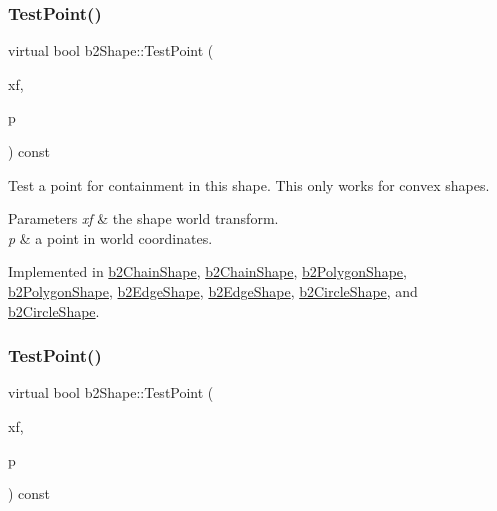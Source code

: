\mbox{\label{classb2Shape_a6ac968e403e2d93e8ae46d728a2e50fa}} 
\subsubsection{\texorpdfstring{Test\+Point()}{TestPoint()}\hspace{0.1cm}{\footnotesize\ttfamily [1/2]}}
{\footnotesize\ttfamily virtual bool b2\+Shape\+::\+Test\+Point (\begin{DoxyParamCaption}\item[{const \hyperlink{structb2Transform}{b2\+Transform} \&}]{xf,  }\item[{const \hyperlink{structb2Vec2}{b2\+Vec2} \&}]{p }\end{DoxyParamCaption}) const\hspace{0.3cm}{\ttfamily [pure virtual]}}

Test a point for containment in this shape. This only works for convex shapes. 
\begin{DoxyParams}{Parameters}
{\em xf} & the shape world transform. \\
\hline
{\em p} & a point in world coordinates. \\
\hline
\end{DoxyParams}


Implemented in \hyperlink{classb2ChainShape_afd03c8679f18f9962a6c76bde629c62a}{b2\+Chain\+Shape}, \hyperlink{classb2ChainShape_a2d2d59b49c2611ad65ed68b0943d642d}{b2\+Chain\+Shape}, \hyperlink{classb2PolygonShape_a1e70b4546c997628bbc8eeffe55c2423}{b2\+Polygon\+Shape}, \hyperlink{classb2PolygonShape_a129c4ac76727fe02724f675e3fef7fe5}{b2\+Polygon\+Shape}, \hyperlink{classb2EdgeShape_a23a429c4cf919ff5140ca28b53db43fe}{b2\+Edge\+Shape}, \hyperlink{classb2EdgeShape_a15151673cf9ad585779c70363425f470}{b2\+Edge\+Shape}, \hyperlink{classb2CircleShape_a764b0ec9fbd65c9ea091672a25eefcf7}{b2\+Circle\+Shape}, and \hyperlink{classb2CircleShape_a84e22b3807e84b72f2981010fc197099}{b2\+Circle\+Shape}.

\mbox{\label{classb2Shape_a6ac968e403e2d93e8ae46d728a2e50fa}} 
\subsubsection{\texorpdfstring{Test\+Point()}{TestPoint()}\hspace{0.1cm}{\footnotesize\ttfamily [2/2]}}
{\footnotesize\ttfamily virtual bool b2\+Shape\+::\+Test\+Point (\begin{DoxyParamCaption}\item[{const \hyperlink{structb2Transform}{b2\+Transform} \&}]{xf,  }\item[{const \hyperlink{structb2Vec2}{b2\+Vec2} \&}]{p }\end{DoxyParamCaption}) const\hspace{0.3cm}{\ttfamily [pure virtual]}}

